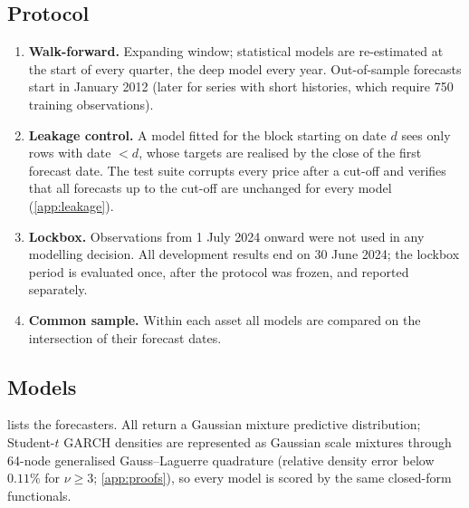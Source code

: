 \subsection{Protocol}
\begin{enumerate}[leftmargin=1.5em]
\item \textbf{Walk-forward.} Expanding window; statistical models are re-estimated at the start of
every quarter, the deep model every year. Out-of-sample forecasts start in January 2012 (later for
series with short histories, which require 750 training observations).
\item \textbf{Leakage control.} A model fitted for the block starting on date $d$ sees only rows with
date $<d$, whose targets are realised by the close of the first forecast date. The test suite
corrupts every price after a cut-off and verifies that all forecasts up to the cut-off are unchanged
for every model (\cref{app:leakage}).
\item \textbf{Lockbox.} Observations from 1 July 2024 onward were not used in any modelling decision.
All development results end on 30 June 2024; the lockbox period is evaluated once, after the protocol
was frozen, and reported separately.
\item \textbf{Common sample.} Within each asset all models are compared on the intersection of their
forecast dates.
\end{enumerate}

\subsection{Models}
 lists the forecasters. All return a Gaussian mixture predictive distribution;
Student-$t$ GARCH densities are represented as Gaussian scale mixtures through 64-node generalised
Gauss--Laguerre quadrature (relative density error below $0.11\%$ for $\nu\ge3$; \cref{app:proofs}),
so every model is scored by the same closed-form functionals.

